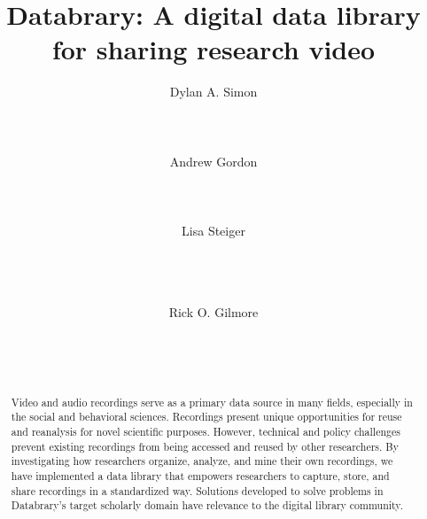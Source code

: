 \documentclass{sig-alternate}
\begin{document}

\title{Databrary: A digital data library for sharing research video}


\author{
\alignauthor
Dylan A. Simon\\
	\\
	\\
	\\
\alignauthor
Andrew Gordon\\
	\\
	\\
	\\
\alignauthor
Lisa Steiger\\
	\\
	\\
	\\
\and
Rick O. Gilmore\\
	\\
	\\
	\\
}

\maketitle

\begin{abstract}
Video and audio recordings serve as a primary data source in many fields, especially in the social and behavioral sciences.
Recordings present unique opportunities for reuse and reanalysis for novel scientific purposes.
However, technical and policy challenges prevent existing recordings from being accessed and reused by other researchers.
By investigating how researchers organize, analyze, and mine their own recordings, we have implemented a data library that empowers researchers to capture, store, and share recordings in a standardized way.
Solutions developed to solve problems in Databrary's target scholarly domain have relevance to the digital library community.
\end{abstract}
\end{document}
